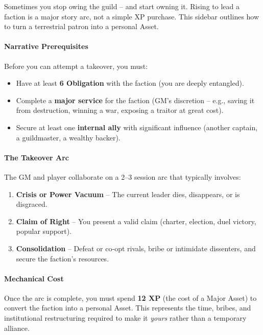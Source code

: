 \begin{tcolorbox}[colback=black!3!white,colframe=black!60!white,title={From Faction to Asset: Taking Over a Terrestrial Patron}]
  Sometimes you stop owing the guild – and start owning it. Rising to lead a faction is a major story arc, not a simple XP purchase. This sidebar outlines how to turn a terrestrial patron into a personal Asset.
  
  \paragraph{Narrative Prerequisites}
  Before you can attempt a takeover, you must:
  \begin{itemize}
    \item Have at least \textbf{6 Obligation} with the faction (you are deeply entangled).
    \item Complete a \textbf{major service} for the faction (GM’s discretion – e.g., saving it from destruction, winning a war, exposing a traitor at great cost).
    \item Secure at least one \textbf{internal ally} with significant influence (another captain, a guildmaster, a wealthy backer).
  \end{itemize}
  
  \paragraph{The Takeover Arc}
  The GM and player collaborate on a 2–3 session arc that typically involves:
  \begin{enumerate}
    \item \textbf{Crisis or Power Vacuum} – The current leader dies, disappears, or is disgraced.
    \item \textbf{Claim of Right} – You present a valid claim (charter, election, duel victory, popular support).
    \item \textbf{Consolidation} – Defeat or co‑opt rivals, bribe or intimidate dissenters, and secure the faction’s resources.
  \end{enumerate}
  
  \paragraph{Mechanical Cost}
  Once the arc is complete, you must spend \textbf{12 XP} (the cost of a Major Asset) to convert the faction into a personal Asset. This represents the time, bribes, and institutional restructuring required to make it \emph{yours} rather than a temporary alliance.
  

\end{tcolorbox}
